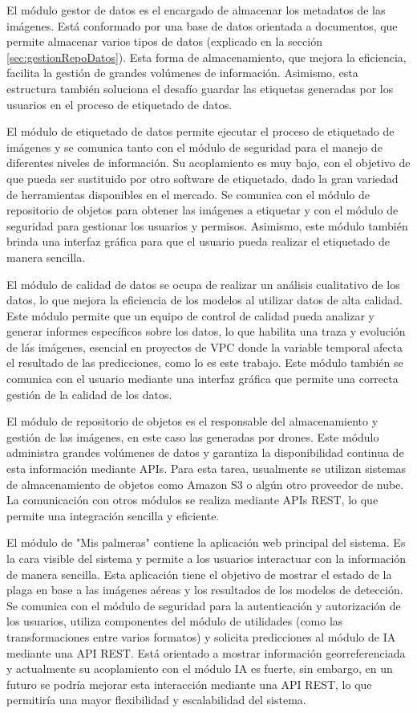 El módulo gestor de datos es el encargado de almacenar los metadatos de las imágenes. Está conformado por una base de datos orientada a documentos, que permite almacenar varios tipos de datos (explicado en la sección \ref{sec:gestionRepoDatos}). Esta forma de almacenamiento, que mejora la eficiencia, facilita la gestión de grandes volúmenes de información. Asimismo, esta estructura también soluciona el desafío guardar las etiquetas generadas por los usuarios en el proceso de etiquetado de datos.

El módulo de etiquetado de datos permite ejecutar el proceso de etiquetado de imágenes y se comunica tanto con el módulo de seguridad para el manejo de diferentes niveles de información. Su acoplamiento es muy bajo, con el objetivo de que pueda ser sustituido por otro software de etiquetado, dado la gran variedad de herramientas disponibles en el mercado. Se comunica con el módulo de repositorio de objetos para obtener las imágenes a etiquetar y con el módulo de seguridad para gestionar los usuarios y permisos. Asimismo, este módulo también brinda una interfaz gráfica para que el usuario pueda realizar el etiquetado de manera sencilla.

El módulo de calidad de datos se ocupa de realizar un análisis cualitativo de los datos, lo que mejora la eficiencia de los modelos al utilizar datos de alta calidad. Este módulo permite que un equipo de control de calidad pueda analizar y generar informes específicos sobre los datos, lo que habilita una traza y evolución de lás imágenes, esencial en proyectos de VPC donde la variable temporal afecta el resultado de las predicciones, como lo es este trabajo. Este módulo también se comunica con el usuario mediante una interfaz gráfica que permite una correcta gestión de la calidad de los datos.

El módulo de repositorio de objetos es el responsable del almacenamiento y gestión de las imágenes, en este caso las generadas por drones. Este módulo administra grandes volúmenes de datos y garantiza la disponibilidad continua de esta información mediante APIs. Para esta tarea, usualmente se utilizan sistemas de almacenamiento de objetos como Amazon S3 \citep{amazon_web_services_aws_nodate} o algún otro proveedor de nube. La comunicación con otros módulos se realiza mediante APIs REST, lo que permite una integración sencilla y eficiente.

El módulo de "Mis palmeras" contiene la aplicación web principal del sistema. Es la cara visible del sistema y permite a los usuarios interactuar con la información de manera sencilla. Esta aplicación tiene el objetivo de mostrar el estado de la plaga en base a las imágenes aéreas y los resultados de los modelos de detección. Se comunica con el módulo de seguridad para la autenticación y autorización de los usuarios, utiliza componentes del módulo de utilidades (como las transformaciones entre varios formatos) y solicita predicciones al módulo de IA mediante una API REST. Está orientado a mostrar información georreferenciada y actualmente su acoplamiento con el módulo IA es fuerte, sin embargo, en un futuro se podría mejorar esta interacción mediante una API REST, lo que permitiría una mayor flexibilidad y escalabilidad del sistema.

